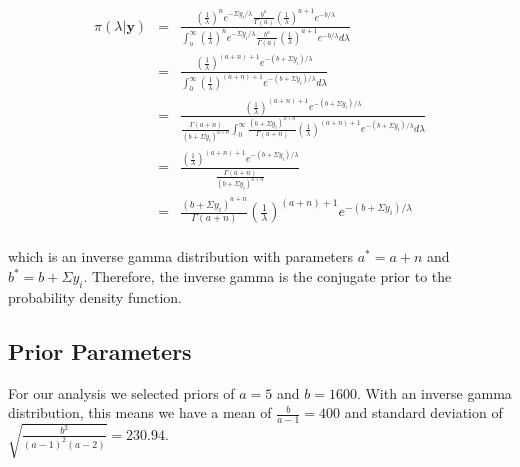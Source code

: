 \documentclass[12pt]{article}
\begin{document}
\begin{eqnarray*}
\pi(\lambda|\mathbf{y}) &=& \frac{\left(\frac{1}{\lambda}\right)^ne^{-\Sigma y_i/\lambda}\frac{b^a}{\Gamma(a)}\left(\frac{1}{\lambda}\right)^{a+1}e^{-b/\lambda}}{\int_o^\infty \left(\frac{1}{\lambda}\right)^ne^{-\Sigma y_i/\lambda}\frac{b^a}{\Gamma(a)}\left(\frac{1}{\lambda}\right)^{a+1}e^{-b/\lambda}d\lambda} \\
&=& \frac{\left(\frac{1}{\lambda}\right)^{(a+n)+1}e^{-(b+\Sigma y_i)/\lambda}}{\int_0^\infty \left(\frac{1}{\lambda}\right)^{(a+n)+1}e^{-(b+\Sigma y_i)/\lambda}d\lambda} \\
&=& \frac{\left(\frac{1}{\lambda}\right)^{(a+n)+1}e^{-(b+\Sigma y_i)/\lambda}}{\frac{\Gamma(a+n)}{(b+\Sigma y_i)^{a+n}}\int_0^\infty \frac{(b+\Sigma y_i)^{a+n}}{\Gamma(a+n)}\left(\frac{1}{\lambda}\right)^{(a+n)+1}e^{-(b+\Sigma y_i)/\lambda}d\lambda} \\
&=& \frac{\left(\frac{1}{\lambda}\right)^{(a+n)+1}e^{-(b+\Sigma y_i)/\lambda}}{\frac{\Gamma(a+n)}{(b+\Sigma y_i)^{a+n}}} \\
&=& \frac{(b+\Sigma y_i)^{a+n}}{\Gamma(a+n)}\left(\frac{1}{\lambda}\right)^{(a+n)+1}e^{-(b+\Sigma y_i)/\lambda} \\
\end{eqnarray*}

\noindent which is an inverse gamma distribution with parameters $a^*=a+n$ and $b^*=b+\Sigma y_i$.  Therefore, the inverse gamma is the conjugate prior to the probability density function.


\subsection{Prior Parameters}

\noindent For our analysis we selected priors of $a=5$ and $b=1600$.  With an inverse gamma distribution, this means we have a mean of $\frac{b}{a-1}=400$ and standard deviation of $\sqrt{\frac{b^2}{(a-1)^2(a-2)}}=230.94$.
\bigskip
\end{document}
